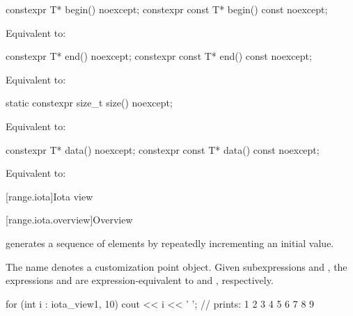 %
\begin{itemdecl}
constexpr T* begin() noexcept;
constexpr const T* begin() const noexcept;
\end{itemdecl}

\begin{itemdescr}
\pnum
\effects
Equivalent to: 
\end{itemdescr}

%
\begin{itemdecl}
constexpr T* end() noexcept;
constexpr const T* end() const noexcept;
\end{itemdecl}

\begin{itemdescr}
\pnum
\effects
Equivalent to: 
\end{itemdescr}

%
\begin{itemdecl}
static constexpr size_t size() noexcept;
\end{itemdecl}

\begin{itemdescr}
\pnum
\effects
Equivalent to: 
\end{itemdescr}

%
\begin{itemdecl}
constexpr T* data() noexcept;
constexpr const T* data() const noexcept;
\end{itemdecl}

\begin{itemdescr}
\pnum
\effects
Equivalent to: 
\end{itemdescr}

[range.iota]{Iota view}

[range.iota.overview]{Overview}

\pnum
{} generates a
sequence of elements by repeatedly incrementing an initial value.

\pnum
The name  denotes a
customization point object.
Given subexpressions  and , the expressions
 and 
are expression-equivalent to
 and , respectively.

\pnum
\begin{example}
\begin{codeblock}
for (int i : iota_view{1, 10})
  cout << i << ' '; // prints: 1 2 3 4 5 6 7 8 9
\end{codeblock}
\end{example}

